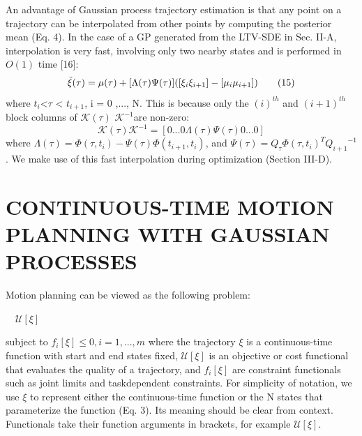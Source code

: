 \documentclass{IEEEtran}
\begin{document}
An advantage of Gaussian process trajectory estimation
is that any point on a trajectory can be interpolated from
other points by computing the posterior mean (Eq. 4). In
the case of a GP generated from the LTV-SDE in Sec. II-A,
interpolation is very fast, involving only two nearby states
and is performed in $\textit{O}(1)$ time [16]:
\begin{equation}
\tilde{\xi}(\tau)=\mu(\tau)+[\Lambda(\tau)\Psi(\tau)]([{\xi_i}\\{\xi_{i+1}}]-[{\mu_i}\\{\mu_{i+1}}])\tag{15}
\end{equation}
where ${t_i}$<${\tau}$ < ${t_{i+1}}$, i = 0 ,..., N. This is because only the
${(i)^{th}}$ and ${(i+1)^{th}}$ block columns of ${\mathcal{K}(\tau)}$ ${\mathcal{K}^{-1}}$are non-zero:
\begin{equation}
{\mathcal{K}(\tau)}{\mathcal{K}^{-1}}=[0...0{\Lambda(\tau)}{\Psi(\tau)}0...0]\tag{16}
\end{equation}
where ${\Lambda(\tau)}=\Phi(\tau,t_i)-\Psi(\tau)\Phi(t_{i+1},t_i)$, and $\Psi(\tau)=Q_{\tau}{\Phi(\tau,t_i)}^T{Q_{i+1}}^{-1}$ . We make use of this fast interpolation
during optimization (Section III-D).
\section{CONTINUOUS-TIME MOTION PLANNING WITH GAUSSIAN PROCESSES}
Motion planning can be viewed as the following problem:

\hspace*{40pt}$\quad \mathcal{U}[\xi]$

\hspace*{40pt}subject to \quad ${f_i[\xi]}\leq0, i=1,...,m$
where the trajectory $\xi$ is a continuous-time function with
start and end states fixed, $\mathcal{U}[\xi]$ is an objective or cost
functional that evaluates the quality of a trajectory, and
$f_i[{\xi}]$ are constraint functionals such as joint limits and taskdependent constraints. For simplicity of notation, we use $\xi$ to
represent either the continuous-time function or the N states
that parameterize the function (Eq. 3). Its meaning should be
clear from context. Functionals take their function arguments
in brackets, for example $\mathcal{U}[\xi]$.
\end{document}
